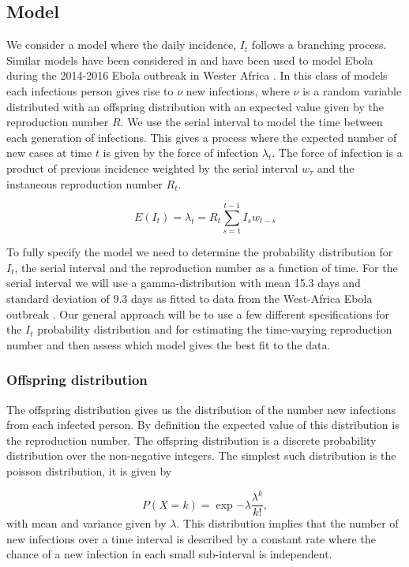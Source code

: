 \documentclass[12pt]{article}
\begin{document}
\subsection{Model}

We consider a model where the daily incidence, $I_t$ follows a branching process. Similar models have been considered in \cite{coriNewFrameworkSoftware2013,lloyd-smithSuperspreadingEffectIndividual2005,nouvelletSimpleApproachMeasure2018} and have been used to model Ebola during the 2014-2016 Ebola outbreak in Wester Africa \cite{EbolaVirusDisease2014, internationalebolaresponseteamExposurePatternsDriving2016}. In this class of models each infectious person gives rise to $\nu$ new infections, where $\nu$ is a random variable distributed with an offspring distribution with an expected value given by the reproduction number $R$. We use the serial interval to model the time between each generation of infections. This gives a process where the expected number of new cases at time $t$ is given by the force of infection $\lambda_t$. The force of infection is a product of previous incidence weighted by the serial interval $w_\tau$ and the instaneous reproduction number $R_t$. 

\[ E(I_t) = \lambda_t =  R_t \sum^{t-1}_{s=1} I_s w_{t-s}\]

To fully specify the model we need to determine the probability distribution for $I_t$, the serial interval and the reproduction number as a function of time. For the serial interval we will use  a gamma-distribution with mean 15.3 days and standard deviation of 9.3 days as fitted to data from the West-Africa Ebola outbreak \cite{EbolaVirusDisease2014}. Our general approach will be to use a few different spesifications for the $I_t$ probability distribution and for estimating the time-varying reproduction number and then assess which model gives the best fit to the data. 
\subsubsection{Offspring distribution}
The offspring distribution gives us the distribution of the number new infections from each infected person. By definition the expected value of this distribution is the reproduction number. The offspring distribution is a discrete probability distribution over the non-negative integers. The simplest such distribution is the poisson distribution, it is given by

\[P(X=k) = \exp{-\lambda}\frac{\lambda^k}{k!}, \]
with mean and variance given by $\lambda$. This distribution implies that the number of new infections over a time interval is described by a constant rate where the chance of a new infection in each small sub-interval is independent.
\end{document}
